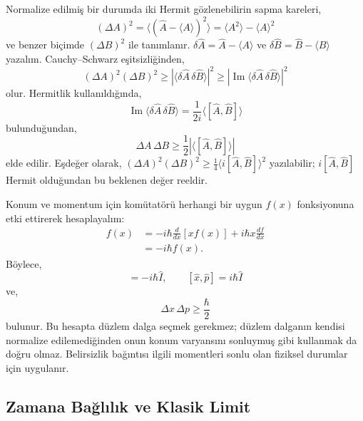 Normalize edilmiş bir durumda iki Hermit gözlenebilirin sapma
kareleri,
\begin{equation}
 (\Delta A)^2=\langle(\hat A-\langle A\rangle)^2\rangle
 =\langle A^2\rangle-\langle A\rangle^2
\end{equation}
ve benzer biçimde $(\Delta B)^2$ ile tanımlanır.
$\delta\hat A=\hat A-\langle A\rangle$ ve
$\delta\hat B=\hat B-\langle B\rangle$ yazalım. Cauchy--Schwarz
 eşitsizliğinden,
\begin{equation}
 (\Delta A)^2(\Delta B)^2
 \ge\left|\langle\delta\hat A\,\delta\hat B\rangle\right|^2
 \ge\left|\operatorname{Im}
           \langle\delta\hat A\,\delta\hat B\rangle\right|^2
\end{equation}
olur. Hermitlik kullanıldığında,
\begin{equation}
 \operatorname{Im}\langle\delta\hat A\,\delta\hat B\rangle
 =\frac{1}{2i}\langle[\hat A,\hat B]\rangle
\end{equation}
bulunduğundan,
\begin{equation}
 \boxed{\Delta A\,\Delta B
 \ge\frac12\left|\langle[\hat A,\hat B]\rangle\right|}
 \label{eq:05_robertson}
\end{equation}
elde edilir. Eşdeğer olarak,
$(\Delta A)^2(\Delta B)^2\ge\frac14\langle i[\hat A,\hat B]\rangle^2$
yazılabilir; $i[\hat A,\hat B]$ Hermit olduğundan bu beklenen değer
reeldir.

Konum ve momentum için komütatörü herhangi bir uygun $f(x)$
fonksiyonuna etki ettirerek hesaplayalım:
\begin{align}
 [\hat p,\hat x]f(x)
 &=-i\hbar\frac{d}{dx}[xf(x)]
   +i\hbar x\frac{df}{dx}\\
 &=-i\hbar f(x).
\end{align}
Böylece,
\begin{equation}
 [\hat p,\hat x]=-i\hbar\hat I,
 \qquad [\hat x,\hat p]=i\hbar\hat I
 \label{eq:05_xp}
\end{equation}
ve,
\begin{equation}
 \boxed{\Delta x\,\Delta p\ge\frac{\hbar}{2}}
\end{equation}
bulunur. Bu hesapta düzlem dalga seçmek gerekmez; düzlem dalganın
kendisi normalize edilemediğinden onun konum varyansını sonluymuş
gibi kullanmak da doğru olmaz. Belirsizlik bağıntısı ilgili
momentleri sonlu olan fiziksel durumlar için uygulanır.

\subsection{Zamana Bağlılık ve Klasik Limit}
\label{sec:05_zaman_klasik}

